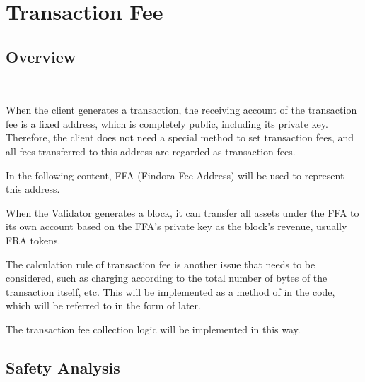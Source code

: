 \clearpage

\section{Transaction Fee}

\subsection{Overview}

~\par

When the client generates a transaction, the receiving account of the transaction fee
is a fixed address, which is completely public, including its private key.
Therefore, the client does not need a special method to set transaction fees,
and all fees transferred to this address are regarded as transaction fees.

In the following content, FFA (Findora Fee Address) will be used to represent this address.

When the Validator generates a block, it can transfer all assets
under the FFA to its own account based on the FFA's private key as the block's revenue, usually FRA tokens.

The calculation rule of transaction fee is another issue that needs to be considered,
such as charging according to the total number of bytes of the transaction itself, etc.
This will be implemented as a method of  in the code,
which will be referred to in the form of  later.

The transaction fee collection logic will be implemented in this way.

\subsection{Safety Analysis}

